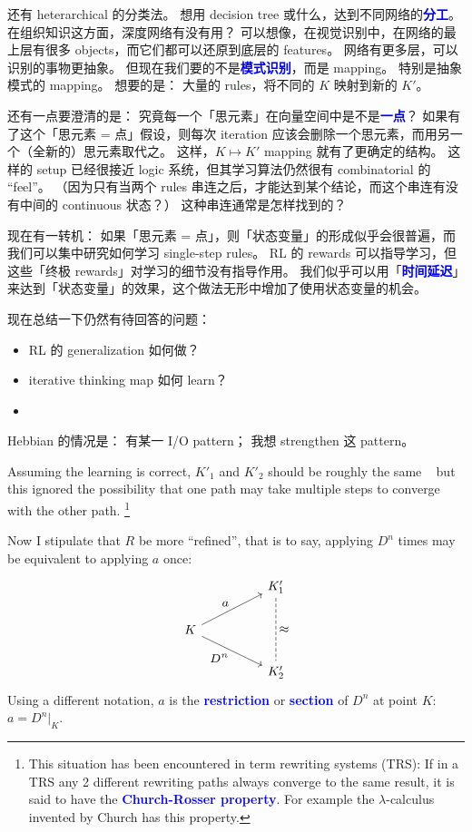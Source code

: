 \documentclass[orivec]{llncs}
\newcommand{\emp}[1]{\textbf{\textcolor{blue}{#1}}}
\begin{document}
还有 heterarchical 的分类法。  想用 decision tree 或什么，达到不同网络的\emp{分工}。  在组织知识这方面，深度网络有没有用？  可以想像，在视觉识别中，在网络的最上层有很多 objects，而它们都可以还原到底层的 features。  网络有更多层，可以识别的事物更抽象。  但现在我们要的不是\emp{模式识别}，而是 mapping。 特别是抽象模式的 mapping。  想要的是： 大量的 rules，将不同的 $K$ 映射到新的 $K'$。

还有一点要澄清的是： 究竟每一个「思元素」在向量空间中是不是\emp{一点}？  如果有了这个「思元素 = 点」假设，则每次 iteration 应该会删除一个思元素，而用另一个（全新的）思元素取代之。  这样，$K \mapsto K'$ mapping 就有了更确定的结构。  这样的 setup 已经很接近 logic 系统，但其学习算法仍然很有 combinatorial 的 ``feel''。 （因为只有当两个 rules 串连之后，才能达到某个结论，而这个串连有没有中间的 continuous 状态？）  这种串连通常是怎样找到的？  

现在有一转机： 如果「思元素 = 点」，则「状态变量」的形成似乎会很普遍，而我们可以集中研究如何学习 single-step rules。 RL 的 rewards 可以指导学习，但这些「终极 rewards」对学习的细节没有指导作用。  我们似乎可以用「\emp{时间延迟}」来达到「状态变量」的效果，这个做法无形中增加了使用状态变量的机会。  

现在总结一下仍然有待回答的问题：
\begin{itemize}
\item RL 的 generalization 如何做？
\item iterative thinking map 如何 learn？
\item 
\end{itemize}

Hebbian 的情况是： 有某一 I/O pattern； 我想 strengthen 这 pattern。 

Assuming the learning is correct, $K'_1$ and $K'_2$ should be roughly the same \textemdash~ but this ignored the possibility that one path may take multiple steps to converge with the other path.  \footnote{This situation has been encountered in term rewriting systems (TRS):  If in a TRS any 2 different rewriting paths always converge to the same result, it is said to have the \emp{Church-Rosser property}.  For example the $\lambda$-calculus invented by Church has this property.} 

Now I stipulate that $R$ be more ``refined'', that is to say, applying $D^n$ times may be equivalent to applying $a$ once:
\begin{equation}
\begin{tikzcd}[column sep=huge]
& K'_1 \arrow[dd, dashed, no head, "\scalebox{1.3}{$\approx$}"] \\
K \arrow[ur, "\scalebox{1.3}{$a$}"] \arrow[dr, "{\scalebox{1.3}{$D^n$}}"'] & \\
& K'_2
\end{tikzcd}
\end{equation}
Using a different notation, $a$ is the \emp{restriction} or \emp{section} of $D^n$ at point $K$: $a = D^n|_K$.
\end{document}
